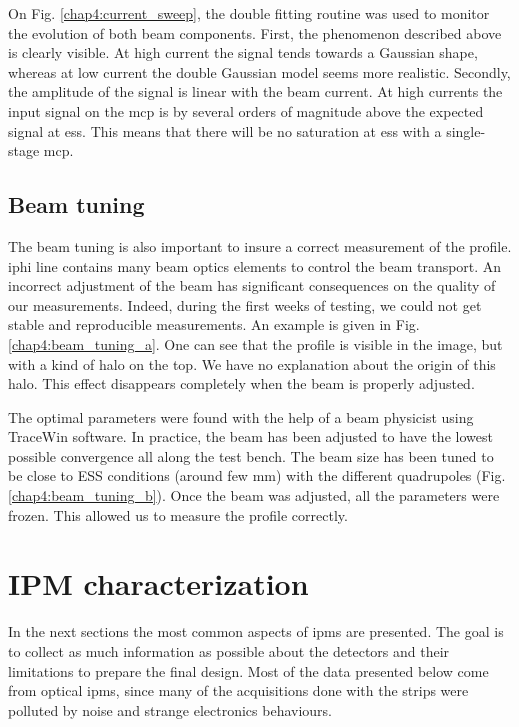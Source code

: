 \begin{refsection}
  

  On Fig. \ref{chap4:current_sweep}, the double fitting routine was used to monitor the evolution of both beam components. First, the phenomenon described above is clearly visible. At high current the signal tends towards a Gaussian shape, whereas at low current the double Gaussian model seems more realistic. Secondly, the amplitude of the signal is linear with the beam current. At high currents the input signal on the \acrshort{mcp} is by several orders of magnitude above the expected signal at \acrshort{ess}. This means that there will be no saturation at \acrshort{ess} with a single-stage \acrshort{mcp}.

  \subsection{Beam tuning}

  The beam tuning is also important to insure a correct measurement of the profile. \acrshort{iphi} line contains many beam optics elements to control the beam transport. An incorrect adjustment of the beam has significant consequences on the quality of our measurements. Indeed, during the first weeks of testing, we could not get stable and reproducible measurements. An example is given in Fig. \ref{chap4:beam_tuning_a}. One can see that the profile is visible in the image, but with a kind of halo on the top. We have no explanation about the origin of this halo. This effect disappears completely when the beam is properly adjusted.

  The optimal parameters were found with the help of a beam physicist using TraceWin software. In practice, the beam has been adjusted to have the lowest possible convergence all along the test bench. The beam size has been tuned to be close to ESS conditions (around few $\mathrm{mm}$) with the different quadrupoles (Fig. \ref{chap4:beam_tuning_b}). Once the beam was adjusted, all the parameters were frozen. This allowed us to measure the profile correctly.

  


  \section{IPM characterization}
  In the next sections the most common aspects of \acrshort{ipm}s are presented. The goal is to collect as much information as possible about the detectors and their limitations to prepare the final design. Most of the data presented below come from optical \acrshort{ipm}s, since many of the acquisitions done with the strips were polluted by noise and strange electronics behaviours.


\end{refsection}
